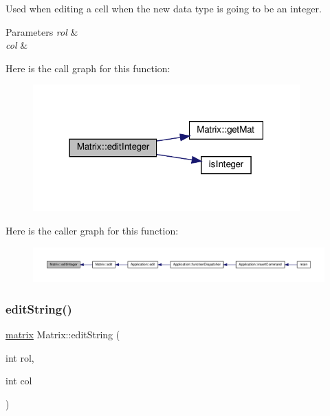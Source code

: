 Used when editing a cell when the new data type is going to be an integer. 
\begin{DoxyParams}{Parameters}
{\em rol} & \\
\hline
{\em col} & \\
\hline
\end{DoxyParams}
Here is the call graph for this function\+:
\nopagebreak
\begin{figure}[H]
\begin{center}
\leavevmode
\includegraphics[width=291pt]{class_matrix_a91c66e2961a16adf56b8d58b916d2d46_cgraph}
\end{center}
\end{figure}
Here is the caller graph for this function\+:
\nopagebreak
\begin{figure}[H]
\begin{center}
\leavevmode
\includegraphics[width=350pt]{class_matrix_a91c66e2961a16adf56b8d58b916d2d46_icgraph}
\end{center}
\end{figure}
\mbox{\label{class_matrix_a7029d8a3cd3c691b46adfd777abc880c}} 
\subsubsection{\texorpdfstring{edit\+String()}{editString()}}
{\footnotesize\ttfamily \hyperlink{formula_8h_a869e2a5deeb3daa4c82d6bc91cf20d92}{matrix} Matrix\+::edit\+String (\begin{DoxyParamCaption}\item[{int}]{rol,  }\item[{int}]{col }\end{DoxyParamCaption})\hspace{0.3cm}{\ttfamily [private]}}

